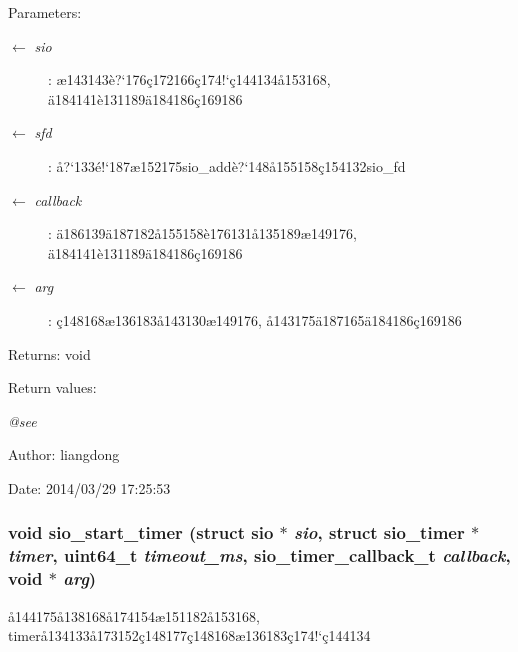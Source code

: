 \begin{Desc}
\item[Parameters:]
\begin{description}
\item[\mbox{$\leftarrow$} {\em sio}]: \ae{}143143\`{e}?`176\c{c}172166\c{c}174!`\c{c}144134\aa{}153168, \"{a}184141\`{e}131189\"{a}184186\c{c}169186 \item[\mbox{$\leftarrow$} {\em sfd}]: \aa{}?`133\'{e}!`187\ae{}152175sio\_\-add\`{e}?`148\aa{}155158\c{c}154132sio\_\-fd \item[\mbox{$\leftarrow$} {\em callback}]: \"{a}186139\"{a}187182\aa{}155158\`{e}176131\aa{}135189\ae{}149176, \"{a}184141\`{e}131189\"{a}184186\c{c}169186 \item[\mbox{$\leftarrow$} {\em arg}]: \c{c}148168\ae{}136183\aa{}143130\ae{}149176, \aa{}143175\"{a}187165\"{a}184186\c{c}169186 \end{description}
\end{Desc}
\begin{Desc}
\item[Returns:]void \end{Desc}
\begin{Desc}
\item[Return values:]
\begin{description}
\item[{\em @see}]\end{description}
\end{Desc}
\begin{Desc}
\item[Author:]liangdong \end{Desc}
\begin{Desc}
\item[Date:]2014/03/29 17:25:53 \end{Desc}
\subsubsection{\setlength{\rightskip}{0pt plus 5cm}void sio\_\-start\_\-timer (struct sio $\ast$ {\em sio}, struct sio\_\-timer $\ast$ {\em timer}, uint64\_\-t {\em timeout\_\-ms}, sio\_\-timer\_\-callback\_\-t {\em callback}, void $\ast$ {\em arg})}\label{sio_8c_a14}


\aa{}144175\aa{}138168\aa{}174154\ae{}151182\aa{}153168, timer\aa{}134133\aa{}173152\c{c}148177\c{c}148168\ae{}136183\c{c}174!`\c{c}144134 

